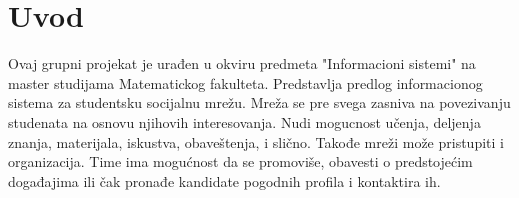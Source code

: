 \section{Uvod}

Ovaj grupni projekat je urađen u okviru predmeta "Informacioni sistemi" na master studijama Matematickog fakulteta. Predstavlja predlog informacionog sistema za studentsku socijalnu mrežu. Mreža se pre svega zasniva na povezivanju studenata na osnovu njihovih interesovanja. Nudi mogucnost učenja, deljenja znanja, materijala, iskustva, obaveštenja, i slično. Takođe mreži može pristupiti i organizacija. Time ima mogućnost da se promoviše, obavesti o predstojećim događajima ili čak pronađe kandidate pogodnih profila i kontaktira ih.
